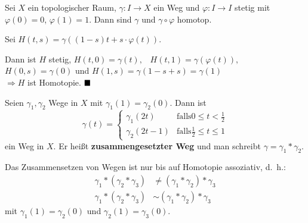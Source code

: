 \begin{bemerkung}\label{kor:homotope-wege}
    Sei $X$ ein topologischer Raum, $\gamma: I \rightarrow X$ ein 
    Weg und $\varphi: I \rightarrow I$ stetig mit $\varphi(0) = 0$,
    $\varphi(1) = 1$. Dann sind $\gamma$ und $\gamma \circ \varphi$
    homotop.
\end{bemerkung}

\begin{beweis}
    Sei $H (t,s) = \gamma ((1-s) t + s \cdot \varphi(t))$.

    Dann ist $H$ stetig, $H(t,0) = \gamma(t),\;\;\; H(t,1) = \gamma ( \varphi(t)),\;\;\;$
    $H(0,s) = \gamma(0)$ und $H(1,s) = \gamma(1-s+s) = \gamma(1)$\\
    $\Rightarrow H$ ist Homotopie. $\qed$
\end{beweis}

\begin{definition}
    Seien $\gamma_1, \gamma_2$ Wege in $X$ mit $\gamma_1(1) = \gamma_2(0)$.
    Dann ist 
    \[\gamma (t) = \begin{cases}
        \gamma_1(2t)   &\text{falls} 0 \leq t < \frac{1}{2}\\
        \gamma_2(2t-1) &\text{falls} \frac{1}{2} \leq t \leq 1
      \end{cases}\]
    ein Weg in $X$. Er heißt \textbf{zusammengesetzter Weg} und man
    schreibt $\gamma = \gamma_1 * \gamma_2$.
\end{definition}

\begin{bemerkung}\label{kor:assoziativitaet-von-zusammensetzen-von-wegen}
    Das Zusammensetzen von Wegen ist nur bis auf 
    Homotopie assoziativ, d.~h.:
    \begin{align*}
        \gamma_1 * (\gamma_2 * \gamma_3) &\neq (\gamma_1 * \gamma_2) * \gamma_3\\
        \gamma_1 * (\gamma_2 * \gamma_3) &\sim (\gamma_1 * \gamma_2) * \gamma_3
    \end{align*}
    mit $\gamma_1(1)=\gamma_2(0)$ und $\gamma_2(1) = \gamma_3(0)$.
\end{bemerkung}

